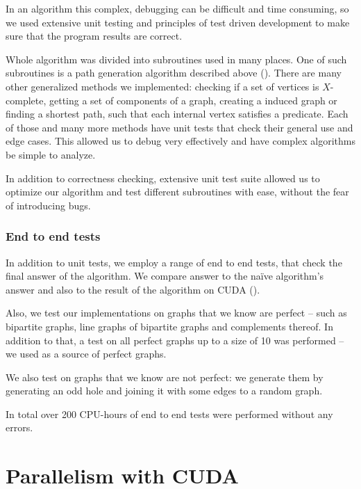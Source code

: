 In an algorithm this complex, debugging can be difficult and time consuming, so we used extensive unit testing and principles of test driven development to make sure that the program results are correct.

Whole algorithm was divided into subroutines used in many places. One of such subroutines is a path generation algorithm described above (). There are many other generalized methods we implemented: checking if a set of vertices is $X$-complete, getting a set of components of a graph, creating a induced graph or finding a shortest path, such that each internal vertex satisfies a predicate. Each of those and many more methods have unit tests that check their general use and edge cases. This allowed us to debug very effectively and have complex algorithms be simple to analyze.

In addition to correctness checking, extensive unit test suite allowed us to optimize our algorithm and test different subroutines with ease, without the fear of introducing bugs.

\subsubsection{End to end tests}

In addition to unit tests, we employ a range of end to end tests, that check the final answer of the algorithm. We compare answer to the na\"ive algorithm's answer and also to the result of the algorithm on CUDA ().

Also, we test our implementations on graphs that we know are perfect -- such as bipartite graphs, line graphs of bipartite graphs and complements thereof. In addition to that, a test on all perfect graphs up to a size of 10 was performed -- we used \cite{graphRepo} as a source of perfect graphs.

We also test on graphs that we know are not perfect: we generate them by generating an odd hole and joining it with some edges to a random graph.

In total over 200 CPU-hours of end to end tests were performed without any errors.

\section{Parallelism with CUDA}
\label{sec:CUDA}

